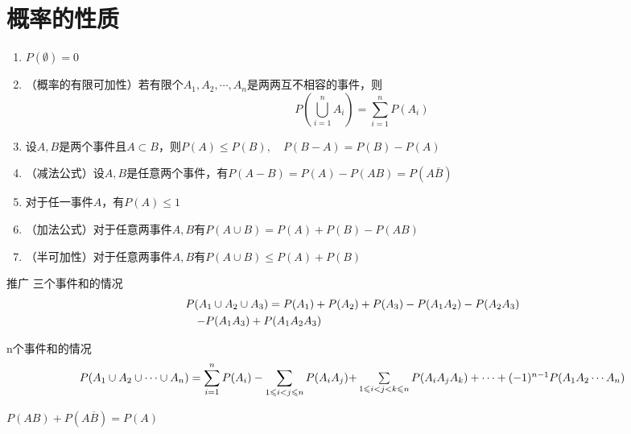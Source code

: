 \section{概率的性质}
\begin{enumerate}
    \item $P(\emptyset ) = 0$
    \item （概率的有限可加性）若有限个${A_1},{A_2}, \cdots ,{A_n}$是两两互不相容的事件，则
          $$P\left( {\bigcup\limits_{i = 1}^n {A_i} } \right) = \sum\limits_{i = 1}^n {P(A_i)}
          $$
    \item 设$A,B$是两个事件且$A \subset B$，则$P(A) \leqslant P(B),\quad P(B - A) = P(B) - P(A) $
    \item （减法公式）设$A,B$是任意两个事件，有$P(A-B)=P(A)-P(AB)=P(A \overline B)$
    \item 对于任一事件$A$，有$P(A) \leq 1$
    \item （加法公式）对于任意两事件$A,B$有$P(A \cup B) = P(A) + P(B) - P(AB)$
    \item （半可加性）对于任意两事件$A,B$有$P(A \cup B) \leqslant P(A) + P(B)$
\end{enumerate}
推广  三个事件和的情况
\begin{equation}
    \begin{gathered}
        P({A_1} \cup {A_2} \cup {A_3})
        = P({A_1}) + P({A_2}) + P({A_3}) - P({A_1}{A_2}) - P({A_2}{A_3}) \hfill \\
        \quad  - P({A_1}{A_3}) + P({A_1}{A_2}{A_3}) \hfill \\
    \end{gathered}
\end{equation}

n个事件和的情况
\begin{equation}
    P({A_1} \cup {A_2} \cup  \cdots  \cup {A_n}) = \sum\limits_{i = 1}^n {P({A_i})}  - \sum\limits_{1 \leqslant i < j \leqslant n} {P({A_i}{A_j})}$$$$ + \sum\limits_{1 \leqslant i < j < k \leqslant n} {P({A_i}{A_j}{A_k})}  +  \cdots  + {( - 1)^{n - 1}}P({A_1}{A_2} \cdots {A_n})
\end{equation}

$P(AB)+P(A\overline{B})=P(A)$
